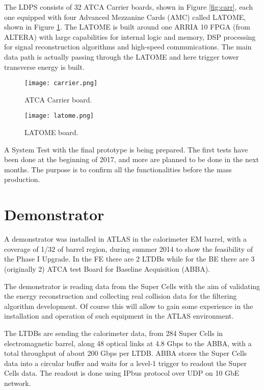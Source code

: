 \documentclass{llncs}
\begin{document}
The LDPS consists of 32 ATCA Carrier boards, shown in Figure \ref{fig:carr}, each one equipped with four Advanced Mezzanine Cards (AMC) called LATOME, shown in Figure \ref{fig:lat}. 
The LATOME is built around one ARRIA 10 FPGA (from ALTERA) with large capabilities for internal logic and memory, DSP processing for signal reconstruction algorithms and high-speed communications. The main data path is actually passing through the LATOME and here trigger tower transverse energy is built.
\begin{figure}[ht]
\begin{minipage}[t]{0.45\textwidth}
		\centering
		\texttt{[image: carrier.png]}
		\caption{ATCA Carrier board.}
		\label{fig:carr}
\end{minipage}
\begin{minipage}[t]{0.55\textwidth}
		\centering
		\texttt{[image: latome.png]}
		\caption{LATOME board.}
		\label{fig:lat}
\end{minipage}
\end{figure}

A System Test with the final prototype is being prepared. The first tests have been done at the beginning of 2017, and more are planned to be done in the next months. The purpose is to confirm all the functionalities before the mass production.

\section{Demonstrator}
A demonstrator was installed in ATLAS in the calorimeter EM barrel, with a coverage of 1/32 of barrel region, during summer 2014 to show the feasibility of the Phase I Upgrade. In the FE there are 2 LTDBs while for the BE there are 3 (originally 2) ATCA test Board for Baseline Acquisition (ABBA).

The demonstrator is reading data from the Super Cells with the aim of validating the energy reconstruction and collecting real collision data for the filtering algorithm development. Of course this will allow to gain some experience in the installation and operation of such equipment in the ATLAS environment.

The LTDBs are sending the calorimeter data, from 284 Super Cells in electromagnetic barrel, along 48 optical links at 4.8 Gbps to the ABBA, with a total throughput of about 200 Gbps per LTDB. ABBA stores the Super Cells data into a circular buffer and waits for a level-1 trigger to readout the Super Cells data. The readout is done using IPbus protocol over UDP on 10 GbE network.
\end{document}

